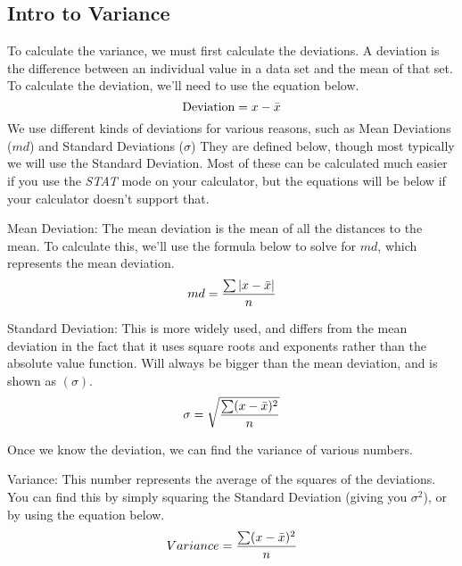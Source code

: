     \subsection{Intro to Variance}
    To calculate the variance, we must first calculate the deviations. 
    A deviation is the difference between an individual value in a data set and the mean of that set.
    To calculate the deviation, we'll need to use the equation below.
    \begin{equation*}
        \mbox{Deviation}= x - \bar{x}
    \end{equation*}
    We use different kinds of deviations for various reasons, such as Mean Deviations ($md$) and Standard Deviations ($\sigma$) They are defined below, though most typically we will use the Standard Deviation. Most of these can be calculated much easier if you use the \emph{STAT} mode on your calculator, but the equations will be below if your calculator doesn't support that.
    \begin{definition}
        Mean Deviation: The mean deviation is the mean of all the distances to the mean. To calculate this, we'll use the formula below to solve for $md$, which represents the mean deviation. 
        \begin{equation*}
            md = \frac{\sum|x-\bar{x}|}{n}
        \end{equation*}
    \end{definition}
    \begin{definition}
        Standard Deviation: This is more widely used, and differs from the mean deviation in the fact that it uses square roots and exponents rather than the absolute value function. Will always be bigger than the mean deviation, and is shown as $(\sigma)$. 
        \begin{equation*}
            \sigma = \sqrt{\frac{\sum(x-\bar{x})^2}{n}}
        \end{equation*}
    \end{definition}
    Once we know the deviation, we can find the variance of various numbers.
    \begin{definition}
        Variance: This number represents the average of the squares of the deviations. You can find this by simply squaring the Standard Deviation (giving you $\sigma^{2}$), or by using the equation below.
        \begin{equation*}
            Variance = \frac{\sum(x-\bar{x})^{2}}{n}
        \end{equation*}
    \end{definition}
    
